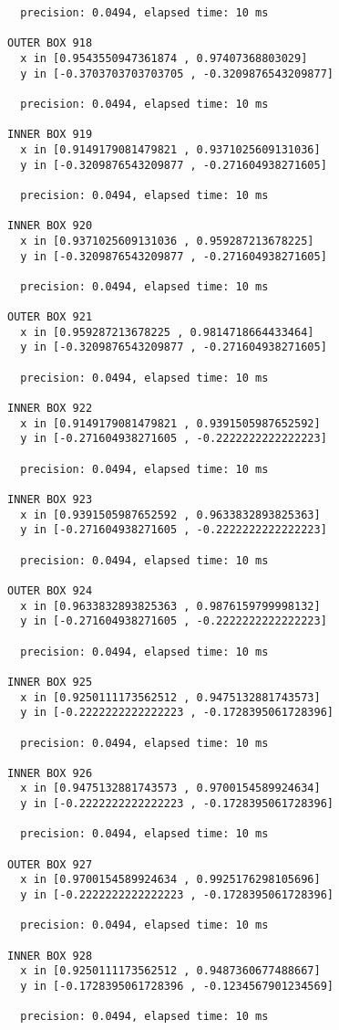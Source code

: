 \begin{verbatim}
  precision: 0.0494, elapsed time: 10 ms

OUTER BOX 918
  x in [0.9543550947361874 , 0.97407368803029]
  y in [-0.3703703703703705 , -0.3209876543209877]

  precision: 0.0494, elapsed time: 10 ms

INNER BOX 919
  x in [0.9149179081479821 , 0.9371025609131036]
  y in [-0.3209876543209877 , -0.271604938271605]

  precision: 0.0494, elapsed time: 10 ms

INNER BOX 920
  x in [0.9371025609131036 , 0.959287213678225]
  y in [-0.3209876543209877 , -0.271604938271605]

  precision: 0.0494, elapsed time: 10 ms

OUTER BOX 921
  x in [0.959287213678225 , 0.9814718664433464]
  y in [-0.3209876543209877 , -0.271604938271605]

  precision: 0.0494, elapsed time: 10 ms

INNER BOX 922
  x in [0.9149179081479821 , 0.9391505987652592]
  y in [-0.271604938271605 , -0.2222222222222223]

  precision: 0.0494, elapsed time: 10 ms

INNER BOX 923
  x in [0.9391505987652592 , 0.9633832893825363]
  y in [-0.271604938271605 , -0.2222222222222223]

  precision: 0.0494, elapsed time: 10 ms

OUTER BOX 924
  x in [0.9633832893825363 , 0.9876159799998132]
  y in [-0.271604938271605 , -0.2222222222222223]

  precision: 0.0494, elapsed time: 10 ms

INNER BOX 925
  x in [0.9250111173562512 , 0.9475132881743573]
  y in [-0.2222222222222223 , -0.1728395061728396]

  precision: 0.0494, elapsed time: 10 ms

INNER BOX 926
  x in [0.9475132881743573 , 0.9700154589924634]
  y in [-0.2222222222222223 , -0.1728395061728396]

  precision: 0.0494, elapsed time: 10 ms

OUTER BOX 927
  x in [0.9700154589924634 , 0.9925176298105696]
  y in [-0.2222222222222223 , -0.1728395061728396]

  precision: 0.0494, elapsed time: 10 ms

INNER BOX 928
  x in [0.9250111173562512 , 0.9487360677488667]
  y in [-0.1728395061728396 , -0.1234567901234569]

  precision: 0.0494, elapsed time: 10 ms


\end{verbatim}
